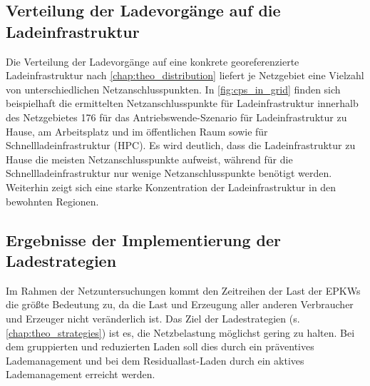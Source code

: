 \subsection{Verteilung der Ladevorgänge auf die Ladeinfrastruktur}\label{chap:distribute_demand_ev}

Die Verteilung der Ladevorgänge auf eine konkrete georeferenzierte Ladeinfrastruktur nach \autoref{chap:theo_distribution} liefert je Netzgebiet eine Vielzahl von unterschiedlichen Netzanschlusspunkten.
In \autoref{fig:cps_in_grid} finden sich beispielhaft die ermittelten Netzanschlusspunkte für Ladeinfrastruktur innerhalb des Netzgebietes \num{176} für das Antriebswende-Szenario für Ladeinfrastruktur zu Hause, am Arbeitsplatz und im öffentlichen Raum sowie für Schnellladeinfrastruktur (\gls{HPC}).
Es wird deutlich, dass die Ladeinfrastruktur zu Hause die meisten Netzanschlusspunkte aufweist, während für die Schnellladeinfrastruktur nur wenige Netzanschlusspunkte benötigt werden.
Weiterhin zeigt sich eine starke Konzentration der Ladeinfrastruktur in den bewohnten Regionen.




\subsection{Ergebnisse der Implementierung der Ladestrategien}\label{chap:results_charging_strategies}

Im Rahmen der Netzuntersuchungen kommt den Zeitreihen der Last der \glspl{EPKW} die größte Bedeutung zu, da die Last und Erzeugung aller anderen Verbraucher und Erzeuger nicht veränderlich ist.
Das Ziel der Ladestrategien (s. \autoref{chap:theo_strategies}) ist es, die Netzbelastung möglichst gering zu halten.
Bei dem gruppierten und reduzierten Laden soll dies durch ein präventives Lademanagement und bei dem Residuallast-Laden durch ein aktives Lademanagement erreicht werden.



